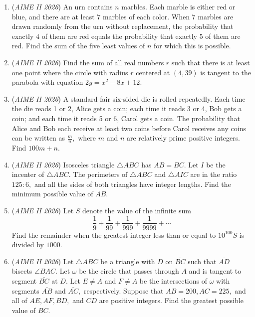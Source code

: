 \begin{enumerate}
 

	\item (\textit{AIME II 2026}) An urn contains $n$ marbles. Each marble is either red or blue, and there are at least $7$ marbles of each color. When $7$ marbles are drawn randomly from the urn without replacement, the probability that exactly $4$ of them are red equals the probability that exactly $5$ of them are red. Find the sum of the five least values of $n$ for which this is possible.


 

	\item (\textit{AIME II 2026}) Find the sum of all real numbers $r$ such that there is at least one point where the circle with radius $r$ centered at $(4, 39)$ is tangent to the parabola with equation $2y = x^2 - 8x + 12.$


	\item (\textit{AIME II 2026}) A standard fair six-sided die is rolled repeatedly. Each time the die reads 1 or 2, Alice gets a coin; each time it reads 3 or 4, Bob gets a coin; and each time it reads 5 or 6, Carol gets a coin. The probability that Alice and Bob each receive at least two coins before Carol receives any coins can be written as $\frac mn,$ where $m$ and $n$ are relatively prime positive integers. Find $100m+n.$


	\item (\textit{AIME II 2026}) Isosceles triangle ${}\triangle ABC$ has $AB = BC.$ Let $I$ be the incenter of ${}\triangle ABC.$ The perimeters of ${}\triangle ABC$ and ${}\triangle AIC$ are in the ratio $125:6,$ and all the sides of both triangles have integer lengths. Find the minimum possible value of $AB.$


	\item (\textit{AIME II 2026}) Let $S$ denote the value of the infinite sum
 \[\frac 19 + \frac 1{99} + \frac 1{999} + \frac 1{9999}  + \cdots\]Find the remainder when the greatest integer less than or equal to $10^{100} S$ is divided by $1000.$


	\item (\textit{AIME II 2026}) Let $\triangle ABC{}$ be a triangle with $D$ on $\overline{BC}$ such that $\overline{AD}{}$ bisects $\angle BAC.$ Let $\omega{}$ be the circle that passes through $A$ and is tangent to segment $\overline{BC}{}$ at $D.$ Let $E \neq A$ and $F \neq A$ be the intersections of $\omega{}$ with segments $\overline{AB}{}$ and $\overline{AC},$ respectively. Suppose that $AB = 200, AC = 225,$ and all of $AE, AF, BD,$ and $CD{}$ are positive integers. Find the greatest possible value of $BC.$



\end{enumerate}
